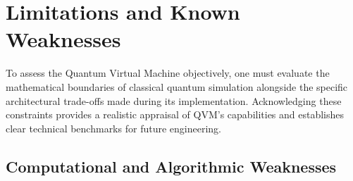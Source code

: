 
\section{Limitations and Known Weaknesses}

To assess the Quantum Virtual Machine objectively, one must evaluate the mathematical boundaries of classical quantum simulation alongside the specific architectural trade-offs made during its implementation. Acknowledging these constraints provides a realistic appraisal of QVM's capabilities and establishes clear technical benchmarks for future engineering.

\subsection{Computational and Algorithmic Weaknesses}


